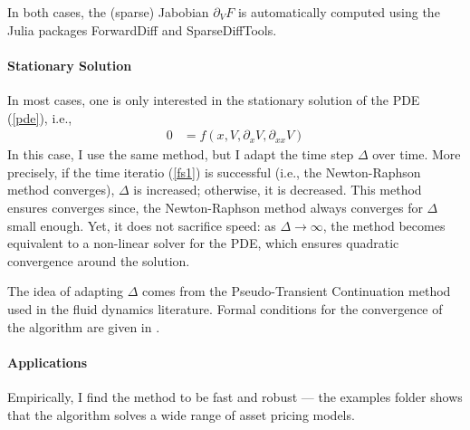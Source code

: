 \documentclass[english]{article}
\begin{document}
	In both cases, the (sparse) Jabobian $\partial_V F$ 	is automatically computed using the Julia packages ForwardDiff and SparseDiffTools. 



	\paragraph{Stationary Solution} In most cases, one is only interested in the stationary solution of the PDE (\ref{pde}), i.e.,
	\begin{align}
		\label{pde2}
		0&=f(x, V, \partial_x V, \partial_{xx} V)
	\end{align}
	In this case, I use the same method, but I adapt the time step $\Delta$ over time. More precisely, if the time iteratio (\ref{fs1}) is successful (i.e., the Newton-Raphson method converges), $\Delta$ is increased; otherwise, it is decreased. This method ensures converges since, the Newton-Raphson method always converges for $\Delta$ small enough. Yet, it does not sacrifice speed: as $\Delta \to \infty$, the method becomes equivalent to a non-linear solver for the PDE, which ensures quadratic convergence around the solution. 

	The idea of adapting $\Delta$ comes from the Pseudo-Transient Continuation method used in the fluid dynamics literature. Formal conditions for the convergence of the algorithm are given in  \citet{kelley1998convergence}. \par

	\paragraph{Applications} Empirically, I find the method to be fast and robust --- the examples folder shows that the algorithm solves a wide range of asset pricing models.
	
	
\end{document}
